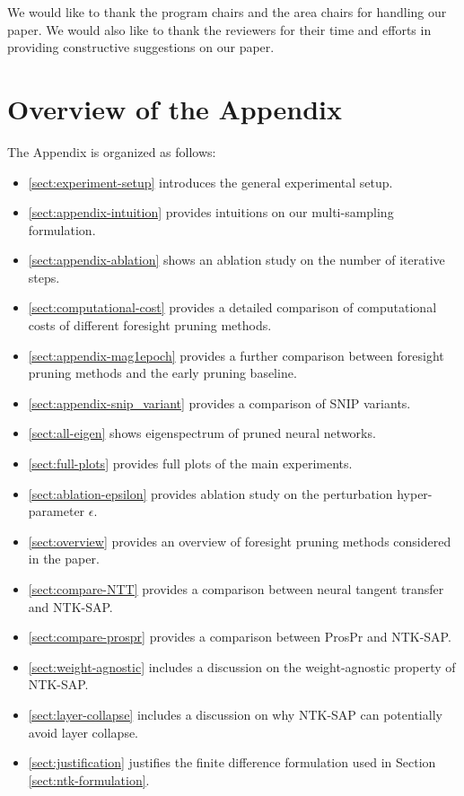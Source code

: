 \documentclass{article} %
\begin{document}
We would like to thank the program chairs and the area chairs for handling our paper. We would also like to thank the reviewers for their time and efforts in providing constructive suggestions on our paper. 


\newpage







\appendix

\newpage

\section*{Overview of the Appendix}
The Appendix is organized as follows:
\begin{itemize}
    \item \autoref{sect:experiment-setup} introduces the general experimental setup.
    \item \autoref{sect:appendix-intuition} provides intuitions on our multi-sampling formulation.
    \item \autoref{sect:appendix-ablation} shows an ablation study on the number of iterative steps.
    \item \autoref{sect:computational-cost} provides a detailed comparison of computational costs of different foresight pruning methods. 
    \item \autoref{sect:appendix-mag1epoch} provides a further comparison between foresight pruning methods and the early pruning baseline. 
    \item \autoref{sect:appendix-snip_variant} provides a comparison of SNIP variants.
    \item \autoref{sect:all-eigen} shows eigenspectrum of pruned neural networks.
    \item \autoref{sect:full-plots} provides full plots of the main experiments.
    \item \autoref{sect:ablation-epsilon} provides ablation study on the perturbation hyper-parameter $\epsilon$.
    \item \autoref{sect:overview} provides an overview of foresight pruning methods considered in the paper. 
    \item \autoref{sect:compare-NTT} provides a comparison between neural tangent transfer and NTK-SAP.
    \item \autoref{sect:compare-prospr} provides a comparison between ProsPr and NTK-SAP.
    \item \autoref{sect:weight-agnostic} includes a discussion on the weight-agnostic property of NTK-SAP.
    \item \autoref{sect:layer-collapse} includes a discussion on why NTK-SAP can potentially avoid layer collapse.
    \item \autoref{sect:justification} justifies the finite difference formulation used in Section \ref{sect:ntk-formulation}.
    
\end{itemize}
\end{document}
